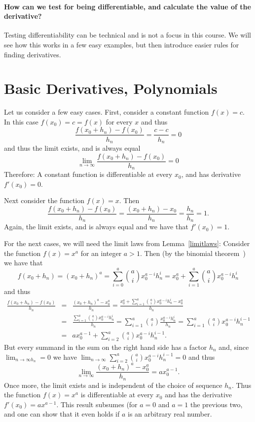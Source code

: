 \paragraph{How can we test for being differentiable,
and calculate the value of the derivative?}
Testing differentiability can be technical and is not a focus in this
course. We will see how this works in a few easy examples, but then
introduce easier rules for finding derivatives.

\section{Basic Derivatives, Polynomials}
\label{secderpol}

Let us consider a few easy cases. First, consider a constant function
$f(x)=c$. In this case $f(x_0)=c=f(x)$ for every $x$ and thus
\[
\frac{f(x_0+h_n)-f(x_0)}{h_n} =\frac{c-c}{h_n}=0
\]
and thus the limit exists, and is always equal
\[
\lim_{n\to\infty} \frac{f(x_0+h_n)-f(x_0)}{h_n}=0
\]
Therefore: A constant function is differentiable at every $x_0$, and has
derivative $f'(x_0)=0$.

Next consider the function $f(x)=x$. Then
\[
\frac{f(x_0+h_n)-f(x_0)}{h_n} =\frac{(x_0+h_n)-x_0}{h_n}=\frac{h_n}{h_n}=1.
\]
Again, the limit exists, and is always equal and we have that
$f'(x_0)=1$.

For the next cases, we will need the limit laws from
Lemma~\ref{limitlaws}: Consider the function $f(x)=x^a$ for an integer
$a>1$. Then (by the binomial theorem~) we
have that
\[
f(x_0+h_n)=(x_0+h_n)^a=\sum_{i=0}^a {a\choose i} x_0^{a-i} h_n^i
=x_0^a+\sum_{i=1}^{a} {a\choose i} x_0^{a-i} h_n^i
\]
and thus
\begin{eqnarray*}
\frac{f(x_0+h_n)-f(x_0)}{h_n}&=&\frac{(x_0+h_n)^a-x_0^a}{h_n}
=\frac{x_0^a+\sum_{i=1}^{a} {a\choose i} x_0^{a-i} h_n^i-x_0^a}{h_n}\\
&=&\frac{\sum_{i=1}^{a} {a\choose i} x_0^{a-i} h_n^{i}}{h_n}
=\sum_{i=1}^{a} {a\choose i} \frac{x_0^{a-i} h_n^{i}}{h_n}
=\sum_{i=1}^{a} {a\choose i} x_0^{a-i} h_n^{i-1}\\
&=&a x_0^{a-1}+\sum_{i=2}^a{a\choose i} x_0^{a-i} h_n^{i-1}.
\end{eqnarray*}
But every summand in the sum on the right hand side has a factor $h_n$ and,
since $\lim_{n\to\infty h_n}=0$ we have
$\lim_{n\to\infty}\sum_{i=2}^a{a\choose i} x_0^{a-i} h_n^{i-1}=0$ and thus
\[
\lim_{n\to\infty}\frac{(x_0+h_n)^a-x_0^a}{h_n}=a x_0^{a-1}.
\]
Once more, the limit exists and is independent of the choice of sequence
$h_n$. Thus the function $f(x)=x^a$ is differentiable at every $x_0$ and has
the derivative $f'(x_0)=a x^{a-1}$. This result subsumes (for $a=0$ and
$a=1$ the previous two, and one can show that it even holds if $a$ is an
arbitrary real number.
\smallskip


